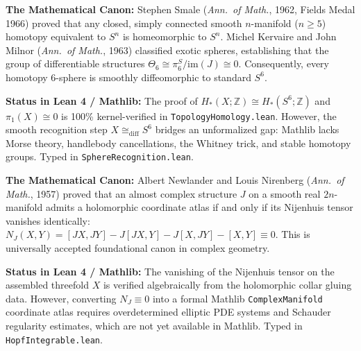 \documentclass[10pt]{article}
\begin{document}
\vspace{-0.9em}

\begin{multicols}{2}
\begin{tcolorbox}[
    colback=orange!4,
    colframe=orange!80!black,
    boxrule=0.6pt,
    arc=1.2mm,
    title={\small\textbf{Featured Formalization Gap 1: Smale $h$-Cobordism \& Kervaire--Milnor Surgery}},
    fonttitle=\sffamily\bfseries,
    top=1.8mm, bottom=1.8mm, left=2.5mm, right=2.5mm
]
\footnotesize
\textbf{The Mathematical Canon:}
Stephen Smale (\textit{Ann.\ of Math.}, 1962, Fields Medal 1966) proved that any closed, simply connected smooth $n$-manifold ($n \ge 5$) homotopy equivalent to $S^n$ is homeomorphic to $S^n$.
Michel Kervaire and John Milnor (\textit{Ann.\ of Math.}, 1963) classified exotic spheres, establishing that the group of differentiable structures $\Theta_6 \cong \pi_6^S / \mathrm{im}(J) \cong 0$. Consequently, every homotopy $6$-sphere is smoothly diffeomorphic to standard $S^6$.

\vspace{0.25em}
\textbf{Status in Lean 4 / Mathlib:}
The proof of $H_*(X;\mathbb{Z}) \cong H_*(S^6;\mathbb{Z})$ and $\pi_1(X) \cong 0$ is 100\% kernel-verified in \texttt{TopologyHomology.lean}. However, the smooth recognition step $X \cong_{\mathrm{diff}} S^6$ bridges an unformalized gap: Mathlib lacks Morse theory, handlebody cancellations, the Whitney trick, and stable homotopy groups. Typed in \texttt{SphereRecognition.lean}.
\end{tcolorbox}

\columnbreak

\begin{tcolorbox}[
    colback=orange!4,
    colframe=orange!80!black,
    boxrule=0.6pt,
    arc=1.2mm,
    title={\small\textbf{Featured Formalization Gap 2: Newlander--Nirenberg Integrability}},
    fonttitle=\sffamily\bfseries,
    top=1.8mm, bottom=1.8mm, left=2.5mm, right=2.5mm
]
\footnotesize
\textbf{The Mathematical Canon:}
Albert Newlander and Louis Nirenberg (\textit{Ann.\ of Math.}, 1957) proved that an almost complex structure $J$ on a smooth real $2n$-manifold admits a holomorphic coordinate atlas if and only if its Nijenhuis tensor vanishes identically: $N_J(X,Y) = [JX, JY] - J[JX, Y] - J[X, JY] - [X, Y] \equiv 0$. This is universally accepted foundational canon in complex geometry.

\vspace{0.25em}
\textbf{Status in Lean 4 / Mathlib:}
The vanishing of the Nijenhuis tensor on the assembled threefold $X$ is verified algebraically from the holomorphic collar gluing data. However, converting $N_J \equiv 0$ into a formal Mathlib \texttt{ComplexManifold} coordinate atlas requires overdetermined elliptic PDE systems and Schauder regularity estimates, which are not yet available in Mathlib. Typed in \texttt{HopfIntegrable.lean}.
\end{tcolorbox}
\end{multicols}
\end{document}
